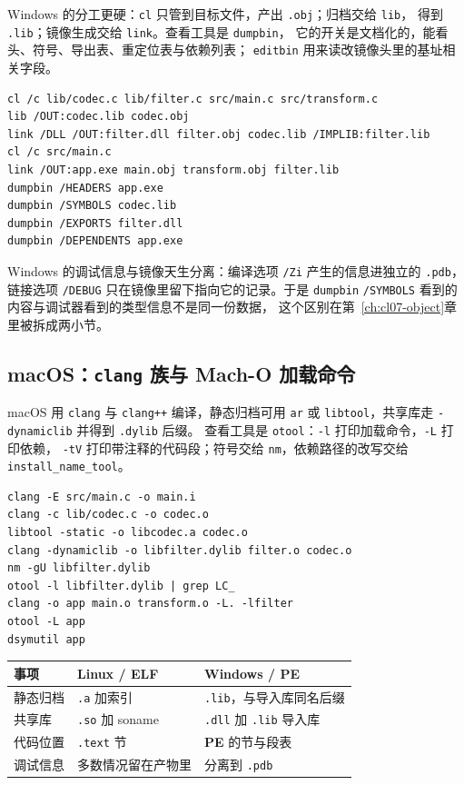 \documentclass[12pt,a4paper,fontset=fandol]{ctexbook}
\newcommand{\Tp}[1]{\texttt{#1}}
\newcommand{\Tool}[1]{\texttt{#1}}
\newcommand{\Sw}[1]{\texttt{#1}}
\newcommand{\Sect}[1]{\texttt{.#1}}
\newcommand{\Elf}{\textbf{\textsf{ELF}}}
\newcommand{\PeFmt}{\textbf{\textsf{PE}}}
\newcommand{\Macho}{\textbf{\textsf{Mach-O}}}
\newcommand{\Nix}{\textsf{Linux}}
\newcommand{\Win}{\textsf{Windows}}
\newcommand{\Mac}{\textsf{macOS}}
\begin{document}
\Win{} 的分工更硬：\Tool{cl} 只管到目标文件，产出 \Tp{.obj}；归档交给 \Tool{lib}，
得到 \Tp{.lib}；镜像生成交给 \Tool{link}。查看工具是 \Tool{dumpbin}，
它的开关是文档化的，能看头、符号、导出表、重定位表与依赖列表；
\Tool{editbin} 用来读改镜像头里的基址相关字段。

\begin{lstlisting}[style=shellstyle, caption={\Win{} 走法：编译、归档、链接三步各自独立（示意流程）}]
cl /c lib/codec.c lib/filter.c src/main.c src/transform.c
lib /OUT:codec.lib codec.obj
link /DLL /OUT:filter.dll filter.obj codec.lib /IMPLIB:filter.lib
cl /c src/main.c
link /OUT:app.exe main.obj transform.obj filter.lib
dumpbin /HEADERS app.exe
dumpbin /SYMBOLS codec.lib
dumpbin /EXPORTS filter.dll
dumpbin /DEPENDENTS app.exe
\end{lstlisting}

\Win{} 的调试信息与镜像天生分离：编译选项 \Sw{/Zi} 产生的信息进独立的
\Tp{.pdb}，链接选项 \Sw{/DEBUG} 只在镜像里留下指向它的记录。于是
\Tool{dumpbin} \Sw{/SYMBOLS} 看到的内容与调试器看到的类型信息不是同一份数据，
这个区别在第~\ref{ch:cl07-object}章里被拆成两小节。

\subsection{\Mac{}：\Tool{clang} 族与 \Macho{} 加载命令}\label{sec:cl15-mac}

\Mac{} 用 \Tool{clang} 与 \Tool{clang++} 编译，静态归档可用 \Tool{ar}
或 \Tool{libtool}，共享库走 \Sw{-dynamiclib} 并得到 \Tp{.dylib} 后缀。
查看工具是 \Tool{otool}：\Sw{-l} 打印加载命令，\Sw{-L} 打印依赖，
\Sw{-tV} 打印带注释的代码段；符号交给 \Tool{nm}，依赖路径的改写交给
\Tool{install\_name\_tool}。

\begin{lstlisting}[style=shellstyle, caption={\Mac{} 走法：加载命令是 \Macho{} 的第一现场（示意流程）}]
clang -E src/main.c -o main.i
clang -c lib/codec.c -o codec.o
libtool -static -o libcodec.a codec.o
clang -dynamiclib -o libfilter.dylib filter.o codec.o
nm -gU libfilter.dylib
otool -l libfilter.dylib | grep LC_
clang -o app main.o transform.o -L. -lfilter
otool -L app
dsymutil app
\end{lstlisting}

\begin{abibox}[title={三个平台把同一件事放在不同位置}]
\begin{tabular}{@{}>{\raggedright\arraybackslash}p{} >{\raggedright\arraybackslash}p{} >{\raggedright\arraybackslash}p{}@{}}
\toprule
事项 & \Nix{} / \Elf{} & \Win{} / \PeFmt{} \\
\midrule
静态归档 & \Tp{.a} 加索引 & \Tp{.lib}，与导入库同名后缀 \\
共享库 & \Tp{.so} 加 soname & \Tp{.dll} 加 \Tp{.lib} 导入库 \\
代码位置 & \Sect{text} 节 & \PeFmt{} 的节与段表 \\
调试信息 & 多数情况留在产物里 & 分离到 \Tp{.pdb} \\
\bottomrule
\end{tabular}
\end{abibox}
\end{document}
